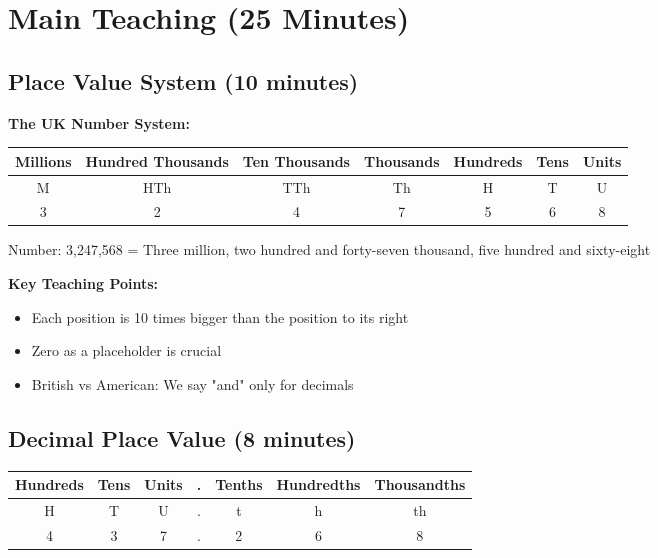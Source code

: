 \documentclass{article}
\begin{document}
\section{Main Teaching (25 Minutes)}

\subsection{Place Value System (10 minutes)}

\textbf{The UK Number System:}

\begin{center}
\begin{tabular}{|c|c|c|c|c|c|c|}
\hline
\textbf{Millions} & \textbf{Hundred Thousands} & \textbf{Ten Thousands} & \textbf{Thousands} & \textbf{Hundreds} & \textbf{Tens} & \textbf{Units} \\
\hline
M & HTh & TTh & Th & H & T & U \\
\hline
3 & 2 & 4 & 7 & 5 & 6 & 8 \\
\hline
\end{tabular}
\end{center}

Number: 3,247,568 = Three million, two hundred and forty-seven thousand, five hundred and sixty-eight

\textbf{Key Teaching Points:}
\begin{itemize}
    \item Each position is 10 times bigger than the position to its right
    \item Zero as a placeholder is crucial
    \item British vs American: We say "and" only for decimals
\end{itemize}

\subsection{Decimal Place Value (8 minutes)}

\begin{center}
\begin{tabular}{|c|c|c|c|c|c|c|}
\hline
\textbf{Hundreds} & \textbf{Tens} & \textbf{Units} & \textbf{.} & \textbf{Tenths} & \textbf{Hundredths} & \textbf{Thousandths} \\
\hline
H & T & U & . & t & h & th \\
\hline
4 & 3 & 7 & . & 2 & 6 & 8 \\
\hline
\end{tabular}
\end{center}
\end{document}
